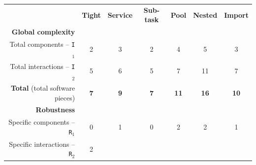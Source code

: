 \documentclass[preprint,3p,twocolumn]{elsarticle}
\begin{document}
\begin{table}
\footnotesize
\centering
\begin{tabular}{rcccccc}
                                     & \textbf{Tight}
                                     & \textbf{Service}
                                     & \textbf{Sub-task}
                                     & \textbf{Pool}
                                     & \textbf{Nested}
                                     & \textbf{Import} \\
\cellcolor[HTML]{EEEEEE}\textbf{Global complexity}& \multicolumn{6}{l}{\cellcolor[HTML]{EEEEEE}}\\
  Total components -- \texttt{I$_1$} & \cellcolor[HTML]{99FF99}2
                                     & \cellcolor[HTML]{99DD99}3
                                     & \cellcolor[HTML]{99FF99}2
                                     & \cellcolor[HTML]{99BB99}4
                                     & \cellcolor[HTML]{999999}5
                                     & \cellcolor[HTML]{99DD99}3\\
Total interactions -- \texttt{I$_2$} & \cellcolor[HTML]{99FF99}5
                                     & \cellcolor[HTML]{99EE99}6
                                     & \cellcolor[HTML]{99FF99}5
                                     & \cellcolor[HTML]{99DD99}7
                                     & \cellcolor[HTML]{999999}11
                                     & \cellcolor[HTML]{99DD99}7\\
\textbf{Total} (total software pieces) & \cellcolor[HTML]{99FF99}\textbf{7}
                                     & \cellcolor[HTML]{99E899}\textbf{9}
                                     & \cellcolor[HTML]{99FF99}\textbf{7}
                                     & \cellcolor[HTML]{99D199}\textbf{11}
                                     & \cellcolor[HTML]{999999}\textbf{16}
                                     & \cellcolor[HTML]{99DD99}\textbf{10}\\
\cellcolor[HTML]{EEEEEE}\textbf{Robustness}& \multicolumn{6}{l}{\cellcolor[HTML]{EEEEEE}}\\
Specific components -- \texttt{R$_1$} & \cellcolor[HTML]{99FF99}0
                                     & \cellcolor[HTML]{99CC99}1
                                     & \cellcolor[HTML]{99FF99}0
                                     & \cellcolor[HTML]{999999}2
                                     & \cellcolor[HTML]{999999}2
                                     & \cellcolor[HTML]{99CC99}1\\
  Specific interactions -- \texttt{R$_2$} & \cellcolor[HTML]{99EA99}2

\end{tabular}
\end{table}
\end{document}
